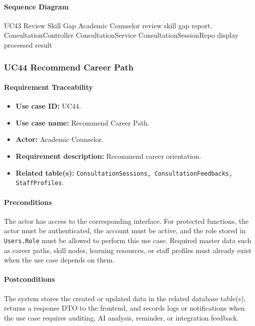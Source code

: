 \paragraph{Sequence Diagram}

\SequenceDiagram
{UC43 Review Skill Gap}
{Academic Counselor}
{review skill gap report.}
{ConsultationController}
{ConsultationService}
{ConsultationSessionRepo}
{display processed result}

\subsubsection{UC44 Recommend Career Path}

\paragraph{Requirement Traceability}

\begin{itemize}
    \item \textbf{Use case ID:} UC44.
    \item \textbf{Use case name:} Recommend Career Path.
    \item \textbf{Actor:} Academic Counselor.
    \item \textbf{Requirement description:} Recommend career orientation.
    \item \textbf{Related table(s):} \texttt{ConsultationSessions, ConsultationFeedbacks, StaffProfiles}.
\end{itemize}

\paragraph{Preconditions}

The actor has access to the corresponding interface. For protected functions, the actor must be authenticated, the account must be active, and the role stored in \texttt{Users.Role} must be allowed to perform this use case. Required master data such as career paths, skill nodes, learning resources, or staff profiles must already exist when the use case depends on them.

\paragraph{Postconditions}

The system stores the created or updated data in the related database table(s), returns a response DTO to the frontend, and records logs or notifications when the use case requires auditing, AI analysis, reminder, or integration feedback.

